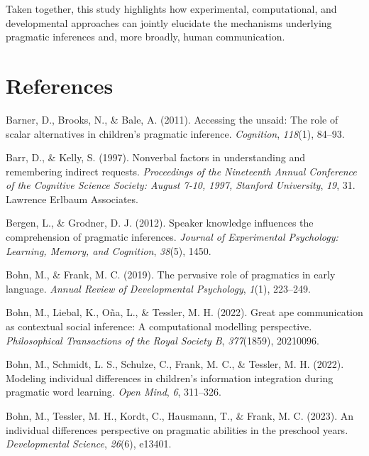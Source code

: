 \documentclass[
  man,floatsintext]{apa6}
\newlength{\cslhangindent}
\newenvironment{CSLReferences}[2] %
 {\begin{list}{}{%
  \setlength{\itemindent}{0pt}
  \setlength{\leftmargin}{0pt}
  \setlength{\parsep}{0pt}
  \ifodd #1
   \setlength{\leftmargin}{\cslhangindent}
   \setlength{\itemindent}{-1\cslhangindent}
  \fi
  \setlength{\itemsep}{#2\baselineskip}}}
 {\end{list}}
\begin{document}
Taken together, this study highlights how experimental, computational, and developmental approaches can jointly elucidate the mechanisms underlying pragmatic inferences and, more broadly, human communication.

\newpage

\section{References}\label{references}

\label{refs}
\begin{CSLReferences}{1}{0}
Barner, D., Brooks, N., \& Bale, A. (2011). Accessing the unsaid: The role of scalar alternatives in children's pragmatic inference. \emph{Cognition}, \emph{118}(1), 84--93.

Barr, D., \& Kelly, S. (1997). Nonverbal factors in understanding and remembering indirect requests. \emph{Proceedings of the Nineteenth Annual Conference of the Cognitive Science Society: August 7-10, 1997, Stanford University}, \emph{19}, 31. Lawrence Erlbaum Associates.

Bergen, L., \& Grodner, D. J. (2012). Speaker knowledge influences the comprehension of pragmatic inferences. \emph{Journal of Experimental Psychology: Learning, Memory, and Cognition}, \emph{38}(5), 1450.

Bohn, M., \& Frank, M. C. (2019). The pervasive role of pragmatics in early language. \emph{Annual Review of Developmental Psychology}, \emph{1}(1), 223--249.

Bohn, M., Liebal, K., Oña, L., \& Tessler, M. H. (2022). Great ape communication as contextual social inference: A computational modelling perspective. \emph{Philosophical Transactions of the Royal Society B}, \emph{377}(1859), 20210096.

Bohn, M., Schmidt, L. S., Schulze, C., Frank, M. C., \& Tessler, M. H. (2022). Modeling individual differences in children's information integration during pragmatic word learning. \emph{Open Mind}, \emph{6}, 311--326.

Bohn, M., Tessler, M. H., Kordt, C., Hausmann, T., \& Frank, M. C. (2023). An individual differences perspective on pragmatic abilities in the preschool years. \emph{Developmental Science}, \emph{26}(6), e13401.


\end{CSLReferences}
\end{document}
